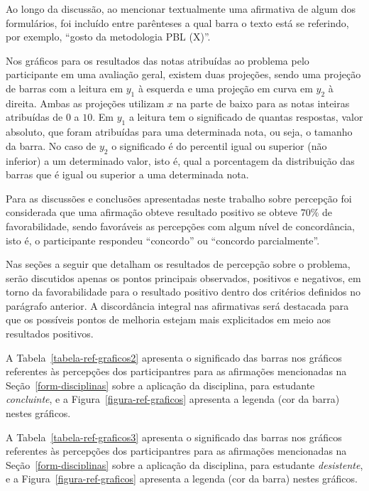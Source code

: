 Ao longo da discussão, ao mencionar textualmente uma afirmativa de
algum dos formulários, foi incluído entre parênteses a qual barra o texto
está se referindo, por exemplo, ``gosto da metodologia PBL (X)''.

Nos gráficos para os resultados das notas atribuídas
ao problema pelo participante em uma avaliação geral,
existem duas projeções, sendo uma projeção de barras com
a leitura em $y_1$ à esquerda e uma projeção em curva
em $y_2$ à direita.
Ambas as projeções utilizam $x$ na parte de baixo para as notas
inteiras atribuídas de $0$ a $10$.
Em $y_1$ a leitura tem o significado de quantas respostas, valor absoluto,
que foram atribuídas para uma determinada nota, ou seja,
o tamanho da barra.
No caso de $y_2$ o significado é do percentil igual ou superior
(não inferior) a um determinado valor, isto é,
qual a porcentagem da distribuição das barras que é igual ou superior
a uma determinada nota.

Para as discussões e conclusões apresentadas neste trabalho
sobre percepção foi considerada que uma afirmação obteve resultado positivo
se obteve $70\%$ de favorabilidade,
sendo favoráveis as percepções com algum nível de concordância,
isto é, o participante respondeu ``concordo''
ou ``concordo parcialmente''.

Nas seções a seguir que detalham os resultados de percepção sobre o problema, 
serão discutidos apenas os pontos principais observados,
positivos e negativos, em torno da favorabilidade para o
resultado positivo dentro dos critérios
definidos no parágrafo anterior.
A discordância integral nas afirmativas será destacada para que
os possíveis pontos de melhoria estejam mais explicitados em meio
aos resultados positivos.

A Tabela~\ref{tabela-ref-graficos2} apresenta
o significado das barras nos gráficos referentes às percepções
dos participantres para as afirmações mencionadas
na Seção~\ref{form-disciplinas} sobre a aplicação da disciplina,
para estudante \textit{concluinte},
e a Figura~\ref{figura-ref-graficos} apresenta a legenda (cor da barra)
nestes gráficos.



A Tabela~\ref{tabela-ref-graficos3} apresenta
o significado das barras nos gráficos referentes às percepções
dos participantres para as afirmações mencionadas
na Seção~\ref{form-disciplinas} sobre a aplicação da disciplina,
para estudante \textit{desistente},
e a Figura~\ref{figura-ref-graficos} apresenta a legenda (cor da barra)
nestes gráficos.

